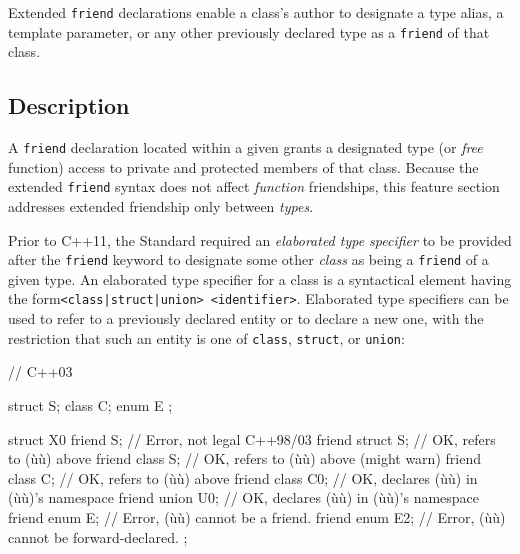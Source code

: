 
\setcounter{table}{0}
\setcounter{footnote}{0}
\setcounter{lstlisting}{0}


Extended \lstinline!friend! declarations enable a class's author to
designate a type alias, a template parameter, or any other previously
declared type as a \lstinline!friend! of that class.

\subsection[Description]{Description}\label{description-extendedfriend}

A \lstinline!friend! declaration located within a given
 grants a designated type (or
\emph{free} function) access to private and protected members of that
class. Because the extended \lstinline!friend! syntax does not affect
\emph{function} friendships, this feature section addresses extended
friendship only between \emph{types}.

Prior to C++11, the Standard required an \emph{elaborated type
specifier} to be provided after the \lstinline!friend! keyword to designate
some other \emph{class} as being a \lstinline!friend! of a given type. An
elaborated type specifier for a class is a syntactical element having the form\linebreak[4]
\mbox{\lstinline!<class|struct|union>!~\lstinline!<identifier>!}. Elaborated
type specifiers can be used to refer to a previously declared entity or
to declare a new one, with the restriction that such an entity is
one of \lstinline!class!, \lstinline!struct!, or \lstinline!union!:

\begin{emcppslisting}
// C++03

struct S;
class C;
enum E { };

struct X0
{
    friend S;         // Error, not legal C++98/03
    friend struct S;  // OK, refers to (ù{}ù) above
    friend class S;   // OK, refers to (ù{}ù) above (might warn)
    friend class C;   // OK, refers to (ù{}ù) above
    friend class C0;  // OK, declares (ù{}ù) in (ù{}ù)'s namespace
    friend union U0;  // OK, declares (ù{}ù) in (ù{}ù)'s namespace
    friend enum E;    // Error, (ù{}ù) cannot be a friend.
    friend enum E2;   // Error, (ù{}ù) cannot be forward-declared.
};
\end{emcppslisting}

